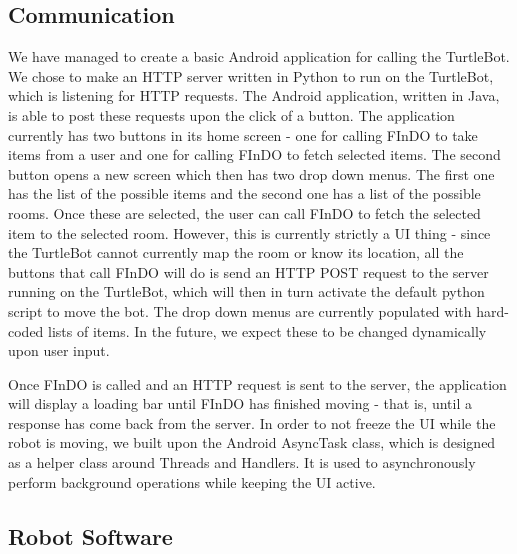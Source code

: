 \documentclass{article}
\begin{document}

\subsection{Communication}

We have managed to create a basic Android application for calling the TurtleBot. We chose to make an HTTP server written in Python to run on the TurtleBot, which is listening for HTTP requests. The Android application, written in Java, is able to post these requests upon the click of a button.
The application currently has two buttons in its home screen - one for calling FInDO to take items from a user and one for calling FInDO to fetch selected items. The second button opens a new screen which then has two drop down menus. The first one has the list of the possible items and the second one has a list of the possible rooms. Once these are selected, the user can call FInDO to fetch the selected item to the selected room. However, this is currently strictly a UI thing - since the TurtleBot cannot currently map the room or know its location, all the buttons that call FInDO will do is send an HTTP POST request to the server running on the TurtleBot, which will then in turn activate the default python script to move the bot. 
The drop down menus are currently populated with hard-coded lists of items. In the future, we expect these to be changed dynamically upon user input.

Once FInDO is called and an HTTP request is sent to the server, the application will display a loading bar until FInDO has finished moving - that is, until a response has come back from the server. In order to not freeze the UI while the robot is moving, we built upon the Android AsyncTask class, which is designed as a helper class around Threads and Handlers. It is used to asynchronously perform background operations while keeping the UI active.

\subsection{Robot Software}
\end{document}
